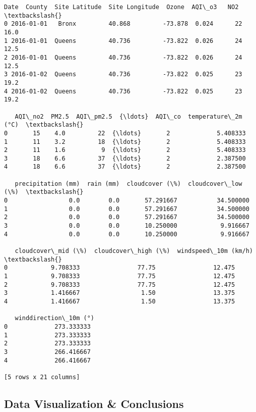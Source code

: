 \documentclass[11pt]{article}
\makeatletter
\newcommand{\boxspacing}{\kern\kvtcb@left@rule\kern\kvtcb@boxsep}
\newcommand{\prompt}[4]{
        {\ttfamily\llap{{\color{#2}[#3]:\hspace{3pt}#4}}\vspace{-\baselineskip}}
    }
\makeatother
\begin{document}
            \begin{tcolorbox}[breakable, size=fbox, boxrule=.5pt, pad at break*=1mm, opacityfill=0]
\prompt{Out}{outcolor}{22}{\boxspacing}
\begin{Verbatim}[commandchars=\\\{\}]
        Date  County  Site Latitude  Site Longitude  Ozone  AQI\_o3   NO2  \textbackslash{}
0 2016-01-01   Bronx         40.868         -73.878  0.024      22  16.0
1 2016-01-01  Queens         40.736         -73.822  0.026      24  12.5
2 2016-01-01  Queens         40.736         -73.822  0.026      24  12.5
3 2016-01-02  Queens         40.736         -73.822  0.025      23  19.2
4 2016-01-02  Queens         40.736         -73.822  0.025      23  19.2

   AQI\_no2  PM2.5  AQI\_pm2.5  {\ldots}  AQI\_co  temperature\_2m (°C)  \textbackslash{}
0       15    4.0         22  {\ldots}       2             5.408333
1       11    3.2         18  {\ldots}       2             5.408333
2       11    1.6          9  {\ldots}       2             5.408333
3       18    6.6         37  {\ldots}       2             2.387500
4       18    6.6         37  {\ldots}       2             2.387500

   precipitation (mm)  rain (mm)  cloudcover (\%)  cloudcover\_low (\%)  \textbackslash{}
0                 0.0        0.0       57.291667           34.500000
1                 0.0        0.0       57.291667           34.500000
2                 0.0        0.0       57.291667           34.500000
3                 0.0        0.0       10.250000            9.916667
4                 0.0        0.0       10.250000            9.916667

   cloudcover\_mid (\%)  cloudcover\_high (\%)  windspeed\_10m (km/h)  \textbackslash{}
0            9.708333                77.75                12.475
1            9.708333                77.75                12.475
2            9.708333                77.75                12.475
3            1.416667                 1.50                13.375
4            1.416667                 1.50                13.375

   winddirection\_10m (°)
0             273.333333
1             273.333333
2             273.333333
3             266.416667
4             266.416667

[5 rows x 21 columns]
\end{Verbatim}
\end{tcolorbox}
        
    \subsection{Data Visualization \&
Conclusions}\label{data-visualization-conclusions}
\end{document}
